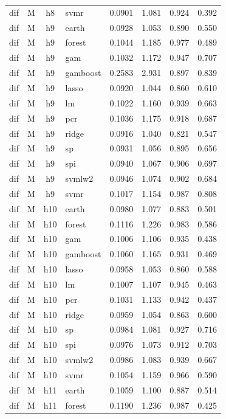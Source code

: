 \begin{ThreePartTable}
\begin{longtable}[t]{llclcccc}
dif & M & h8 & svmr & 0.0901 & 1.081 & 0.924 & 0.392\\
\addlinespace
dif & M & h9 & earth & 0.0928 & 1.053 & 0.890 & 0.550\\
dif & M & h9 & forest & 0.1044 & 1.185 & 0.977 & 0.489\\
dif & M & h9 & gam & 0.1032 & 1.172 & 0.947 & 0.707\\
dif & M & h9 & gamboost & 0.2583 & 2.931 & 0.897 & 0.839\\
dif & M & h9 & lasso & 0.0920 & 1.044 & 0.860 & 0.610\\
dif & M & h9 & lm & 0.1022 & 1.160 & 0.939 & 0.663\\
dif & M & h9 & pcr & 0.1036 & 1.175 & 0.918 & 0.687\\
dif & M & h9 & ridge & 0.0916 & 1.040 & 0.821 & 0.547\\
dif & M & h9 & sp & 0.0931 & 1.056 & 0.895 & 0.656\\
dif & M & h9 & spi & 0.0940 & 1.067 & 0.906 & 0.697\\
dif & M & h9 & svmlw2 & 0.0946 & 1.074 & 0.902 & 0.684\\
dif & M & h9 & svmr & 0.1017 & 1.154 & 0.987 & 0.808\\
\addlinespace
dif & M & h10 & earth & 0.0980 & 1.077 & 0.883 & 0.501\\
dif & M & h10 & forest & 0.1116 & 1.226 & 0.983 & 0.586\\
dif & M & h10 & gam & 0.1006 & 1.106 & 0.935 & 0.438\\
dif & M & h10 & gamboost & 0.1060 & 1.165 & 0.931 & 0.469\\
dif & M & h10 & lasso & 0.0958 & 1.053 & 0.860 & 0.588\\
dif & M & h10 & lm & 0.1007 & 1.107 & 0.945 & 0.463\\
dif & M & h10 & pcr & 0.1031 & 1.133 & 0.942 & 0.437\\
dif & M & h10 & ridge & 0.0959 & 1.054 & 0.863 & 0.600\\
dif & M & h10 & sp & 0.0984 & 1.081 & 0.927 & 0.716\\
dif & M & h10 & spi & 0.0976 & 1.073 & 0.912 & 0.703\\
dif & M & h10 & svmlw2 & 0.0986 & 1.083 & 0.939 & 0.667\\
dif & M & h10 & svmr & 0.1054 & 1.159 & 0.966 & 0.590\\
\addlinespace
dif & M & h11 & earth & 0.1059 & 1.100 & 0.887 & 0.514\\
dif & M & h11 & forest & 0.1190 & 1.236 & 0.987 & 0.425\\

\end{longtable}
\end{ThreePartTable}
